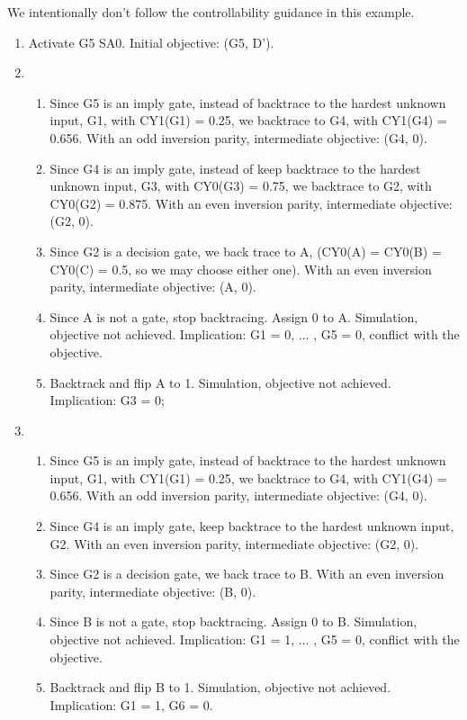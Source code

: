 We intentionally don't follow the controllability guidance in this example.

\begin{enumerate}
  \item Activate G5 SA0. Initial objective: (G5, D').
  \item {
    \begin{enumerate}
      \item Since G5 is an imply gate, instead of backtrace to the hardest unknown input, G1, with CY1(G1) = 0.25, we backtrace to G4, with CY1(G4) = 0.656. With an odd inversion parity, intermediate objective: (G4, 0).
      \item Since G4 is an imply gate, instead of keep backtrace to the hardest unknown input, G3, with CY0(G3) = 0.75, we backtrace to G2, with CY0(G2) = 0.875. With an even inversion parity, intermediate objective: (G2, 0).
      \item Since G2 is a decision gate, we back trace to A, (CY0(A) = CY0(B) = CY0(C) = 0.5, so we may choose either one). With an even inversion parity, intermediate objective: (A, 0).
      \item Since A is not a gate, stop backtracing. Assign 0 to A. Simulation, objective not achieved. Implication: G1 = 0, ... , G5 = 0, conflict with the objective.
      \item Backtrack and flip A to 1. Simulation, objective not achieved. Implication: G3 = 0;
    \end{enumerate}
  }
  \item {
    \begin{enumerate}
      \item Since G5 is an imply gate, instead of backtrace to the hardest unknown input, G1, with CY1(G1) = 0.25, we backtrace to G4, with CY1(G4) = 0.656. With an odd inversion parity, intermediate objective: (G4, 0).
      \item Since G4 is an imply gate, keep backtrace to the hardest unknown input, G2. With an even inversion parity, intermediate objective: (G2, 0).
      \item Since G2 is a decision gate, we back trace to B. With an even inversion parity, intermediate objective: (B, 0).
      \item Since B is not a gate, stop backtracing. Assign 0 to B. Simulation, objective not achieved. Implication: G1 = 1, ... , G5 = 0, conflict with the objective.
      \item Backtrack and flip B to 1. Simulation, objective not achieved. Implication: G1 = 1, G6 = 0.

\end{enumerate}}
\end{enumerate}
